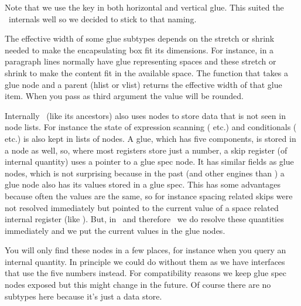 
Note that we use the key  in both horizontal and vertical glue. This
suited the \TEX\ internals well so we decided to stick to that naming.

The effective width of some glue subtypes depends on the stretch or shrink needed
to make the encapsulating box fit its dimensions. For instance, in a paragraph
lines normally have glue representing spaces and these stretch or shrink to make
the content fit in the available space. The  function that
takes a glue node and a parent (hlist or vlist) returns the effective width of
that glue item. When you pass  as third argument the value will be
rounded.


\stopsubsection

\startsubsection[title={gluespec}]

Internally \LUAMETATEX\ (like its ancestors) also uses nodes to store data that
is not seen in node lists. For instance the state of expression scanning (\type
{\dimexpr} etc.) and conditionals (\type {\ifcase} etc.) is also kept in lists of
nodes. A glue, which has five components, is stored in a node as well, so, where
most registers store just a number, a skip register (of internal quantity) uses a
pointer to a glue spec node. It has similar fields as glue nodes, which is not
surprising because in the past (and other engines than \LUATEX) a glue node also
has its values stored in a glue spec. This has some advantages because often the
values are the same, so for instance spacing related skips were not resolved
immediately but pointed to the current value of a space related internal register
(like \type {\spaceskip}). But, in \LUATEX\ and therefore \LUAMETATEX\ we do
resolve these quantities immediately and we put the current values in the glue
nodes.


You will only find these nodes in a few places, for instance when you query an
internal quantity. In principle we could do without them as we have interfaces
that use the five numbers instead. For compatibility reasons we keep glue spec
nodes exposed but this might change in the future. Of course there are no
subtypes here because it's just a data store.


